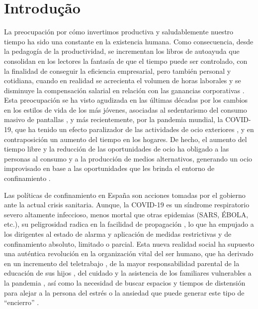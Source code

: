 \documentclass{textolivre}
\begin{document}
\section{Introdução}\label{sec-intro}
La preocupación por cómo invertimos productiva y saludablemente nuestro tiempo ha sido una constante en la existencia humana. Como consecuencia, desde la pedagogía de la productividad, se incrementan los libros de autoayuda que consolidan en los lectores la fantasía de que el tiempo puede ser controlado, con la finalidad de conseguir la eficiencia empresarial, pero también personal y cotidiana, cuando en realidad se acrecienta el volumen de horas laborales y se disminuye la compensación salarial en relación con las ganancias corporativas \cite{gregg2018}. Esta preocupación se ha visto agudizada en las últimas décadas por los cambios en los estilos de vida de los más jóvenes, asociadas al sedentarismo del consumo masivo de pantallas \cite{wang2019}, y más recientemente, por la pandemia mundial, la COVID-19, que ha tenido un efecto paralizador de las actividades de ocio exteriores \cite{cencerradomalmierca2020}, y en contraposición un aumento del tiempo en los hogares. De hecho, el aumento del tiempo libre y la reducción de las oportunidades de ocio ha obligado a las personas al consumo y a la producción de medios alternativos, generando un ocio improvisado en base a las oportunidades que les brinda el entorno de confinamiento \cite{bond2020}.

Las políticas de confinamiento en España son acciones tomadas por el gobierno ante la actual crisis sanitaria. Aunque, la COVID-19 es un síndrome respiratorio severo altamente infeccioso, menos mortal que otras epidemias (SARS, ÉBOLA, etc.), su peligrosidad radica en la facilidad de propagación \cite{callaway2020}, lo que ha empujado a los dirigentes al estado de alarma y aplicación de medidas restrictivas y de confinamiento absoluto, limitado o parcial. Esta nueva realidad social ha supuesto una auténtica revolución en la organización vital del ser humano, que ha derivado en un incremento del teletrabajo \cite{santillan2020}, de la mayor responsabilidad parental de la educación de sus hijos \cite{moreno2020}, del cuidado y la asistencia de los familiares vulnerables a la pandemia \cite{rodriguezescanciano2020}, así como la necesidad de buscar espacios y tiempos de distensión para alejar a la persona del estrés o la ansiedad que puede generar este tipo de “encierro” \cite{ozamiz-etxebarria2020}. 
\end{document}
